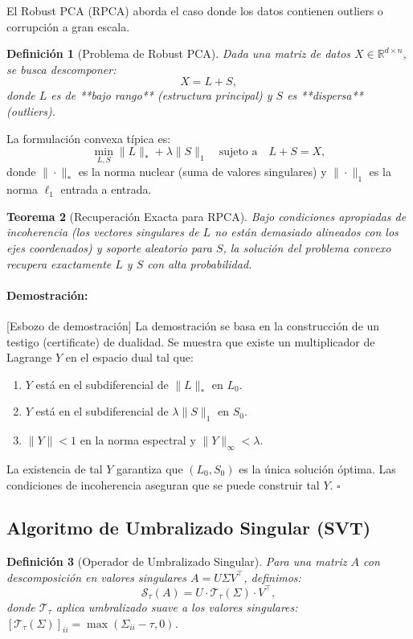 \documentclass[11pt]{article}
\theoremstyle{plain}
\newtheorem{theorem}{Teorema}[section]
\newtheorem{definition}[theorem]{Definición}
\newenvironment{proof}{\paragraph{Demostración:}}{\hfill$\square$}
\begin{document}
El Robust PCA (RPCA) aborda el caso donde los datos contienen outliers o corrupción a gran escala.

\begin{definition}[Problema de Robust PCA]
Dada una matriz de datos $X \in \mathbb{R}^{d \times n}$, se busca descomponer:
\[
X = L + S,
\]
donde $L$ es de **bajo rango** (estructura principal) y $S$ es **dispersa** (outliers).
\end{definition}

La formulación convexa típica es:
\[
\min_{L, S} \|L\|_* + \lambda \|S\|_1 \quad \text{sujeto a} \quad L + S = X,
\]
donde $\|\cdot\|_*$ es la norma nuclear (suma de valores singulares) y $\|\cdot\|_1$ es la norma $\ell_1$ entrada a entrada.

\begin{theorem}[Recuperación Exacta para RPCA]
\label{thm:rpca_recovery}
Bajo condiciones apropiadas de incoherencia (los vectores singulares de $L$ no están demasiado alineados con los ejes coordenados) y soporte aleatorio para $S$, la solución del problema convexo recupera exactamente $L$ y $S$ con alta probabilidad.
\end{theorem}

\begin{proof}[Esbozo de demostración]
La demostración se basa en la construcción de un testigo (certificate) de dualidad. Se muestra que existe un multiplicador de Lagrange $Y$ en el espacio dual tal que:
\begin{enumerate}
    \item $Y$ está en el subdiferencial de $\|L\|_*$ en $L_0$.
    \item $Y$ está en el subdiferencial de $\lambda\|S\|_1$ en $S_0$.
    \item $\|Y\| < 1$ en la norma espectral y $\|Y\|_\infty < \lambda$.
\end{enumerate}
La existencia de tal $Y$ garantiza que $(L_0, S_0)$ es la única solución óptima. Las condiciones de incoherencia aseguran que se puede construir tal $Y$.
\end{proof}

\subsection{Algoritmo de Umbralizado Singular (SVT)}

\begin{definition}[Operador de Umbralizado Singular]
Para una matriz $A$ con descomposición en valores singulares $A = U \Sigma V^\top$, definimos:
\[
\mathcal{S}_\tau(A) = U \cdot \mathcal{T}_\tau(\Sigma) \cdot V^\top,
\]
donde $\mathcal{T}_\tau$ aplica umbralizado suave a los valores singulares: $[\mathcal{T}_\tau(\Sigma)]_{ii} = \max(\Sigma_{ii} - \tau, 0)$.
\end{definition}
\end{document}
